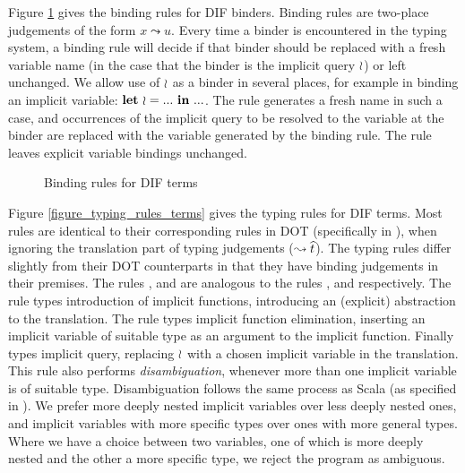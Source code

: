 Figure \ref{figure_binding_rules} gives the binding rules for DIF binders.
Binding rules are two-place judgements of the form $x \leadsto u$. Every time a
binder is encountered in the typing system, a binding rule will decide if that
binder should be replaced with a fresh variable name (in the case that the
binder is the implicit query $\wr$) or left unchanged. We allow use of $\wr$
as a binder in several places, for example in binding an implicit variable:
$\textbf{let}\ \wr = ...\ \textbf{in}\ ...$. The rule  generates a fresh name in such a
case, and occurrences of the implicit query to be resolved to the variable at
the binder are replaced with the variable generated by the binding rule. The
rule  leaves explicit variable bindings unchanged.
\begin{figure}[h]
    \vspace{-2mm}
    
    \caption{Binding rules for DIF terms}
    \label{figure_binding_rules}
\end{figure}
Figure \ref{figure_typing_rules_terms} gives the typing rules for DIF terms.
Most rules are identical to their corresponding rules in DOT (specifically in
\cite{AGORS16}), when ignoring the translation part of typing judgements
($\leadsto \widehat{t}$). The typing rules differ slightly from their DOT
counterparts in that they have binding judgements in their premises. The rules
,  and  are analogous to the rules
,  and  respectively. The rule
 types introduction of implicit functions, introducing an
(explicit) abstraction to the translation. The rule  types
implicit function elimination, inserting an implicit variable of suitable type
as an argument to the implicit function. Finally  types implicit
query, replacing $\wr$ with a chosen implicit variable in the translation.
This rule also performs \emph{disambiguation}, whenever more than one implicit
variable is of suitable type. Disambiguation follows the same process as Scala
(as specified in \cite{OBLB18}). We prefer more deeply nested implicit
variables over less deeply nested ones, and implicit variables with more
specific types over ones with more general types. Where we have a choice
between two variables, one of which is more deeply nested and the other a more
specific type, we reject the program as ambiguous.

\begin{figure*}[h]
    
    \caption{Typing and translation rules for DIF terms}
    \label{figure_typing_rules_terms}
\end{figure*}

